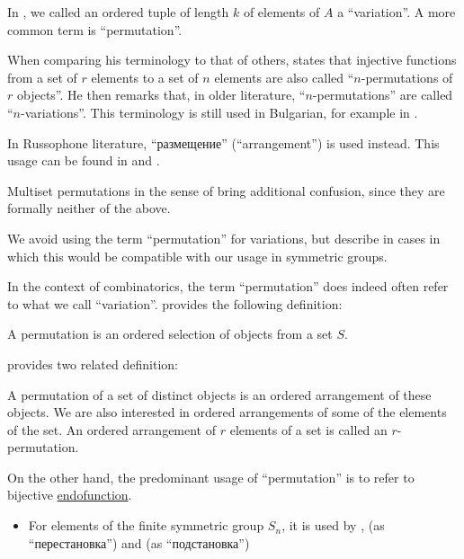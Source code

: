 \begin{remark}\label{rem:combinatorial_permutation_terminology}
  In , we called an ordered tuple of length \( k \) of elements of \( A \) a \enquote{variation}. A more common term is \enquote{permutation}.

  When comparing his terminology to that of others,  states that injective functions from a set of \( r \) elements to a set of \( n \) elements are also called \enquote{\( n \)-permutations of \( r \) objects}. He then remarks that, in older literature, \enquote{\( n \)-permutations} are called \enquote{\( n \)-variations}. This terminology is still used in Bulgarian, for example in \cite[27]{ДимитровЯнев2007ВероятностиИСтатистика}.

  In Russophone literature, \enquote{размещение} (\enquote{arrangement}) is used instead. This usage can be found in  and .

  Multiset permutations in the sense of  bring additional confusion, since they are formally neither of the above.

  We avoid using the term \enquote{permutation} for variations, but describe in  cases in which this would be compatible with our usage in symmetric groups.

  In the context of combinatorics, the term \enquote{permutation} does indeed often refer to what we call \enquote{variation}.  provides the following definition:
  \begin{displayquote}
    A permutation is an ordered selection of objects from a set \( S \).
  \end{displayquote}

   provides two related definition:
  \begin{displayquote}
    A permutation of a set of distinct objects is an ordered arrangement of these objects. We are also interested in ordered arrangements of some of the elements of the set. An ordered arrangement of \( r \) elements of a set is called an \( r \)-permutation.
  \end{displayquote}

  On the other hand, the predominant usage of \enquote{permutation} is to refer to bijective \hyperref[def:function/endofunction]{endofunction}.
  \begin{itemize}
    \item For elements of the finite symmetric group \( S_n \), it is used by
    ,
     (as \enquote{перестановка}) and
     (as \enquote{подстановка})


\end{itemize}
\end{remark}
